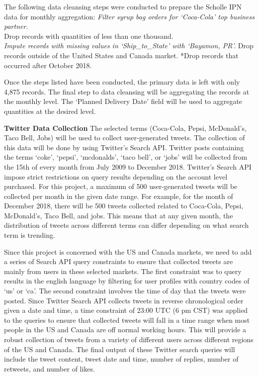 \documentclass[12pt,oneside]{chicagocapstone}
\begin{document}
The following data cleansing steps were conducted to prepare the Scholle IPN data for monthly aggregation:
\emph{Filter syrup bag orders for `Coca-Cola' top business partner.\\
}Drop records with quantities of less than one thousand.\\
\emph{Impute records with missing values in `Ship\_to\_State' with `Bayamon, PR'.
}Drop records outside of the United States and Canada market.
*Drop records that occurred after October 2018.

Once the steps listed have been conducted, the primary data is left with only 4,875 records. The final step to data cleansing will be aggregating the records at the monthly level. The `Planned Delivery Date' field will be used to aggregate quantities at the desired level.

\textbf{Twitter Data Collection}
The selected terms (Coca-Cola, Pepsi, McDonald's, Taco Bell, Jobs) will be used to collect user-generated tweets. The collection of this data will be done by using Twitter's Search API. Twitter posts containing the terms `coke', `pepsi', `mcdonalds', `taco bell', or `jobs' will be collected from the 15th of every month from July 2009 to December 2018. Twitter's Search API impose strict restrictions on query results depending on the account level purchased. For this project, a maximum of 500 user-generated tweets will be collected per month in the given date range. For example, for the month of December 2018, there will be 500 tweets collected related to Coca-Cola, Pepsi, McDonald's, Taco Bell, and jobs. This means that at any given month, the distribution of tweets across different terms can differ depending on what search term is trending.

Since this project is concerned with the US and Canada markets, we need to add a series of Search API query constraints to ensure that collected tweets are mainly from users in these selected markets. The first constraint was to query results in the english language by filtering for user profiles with country codes of `us' or `ca'. The second constraint involves the time of day that the tweets were posted. Since Twitter Search API collects tweets in reverse chronological order given a date and time, a time constraint of 23:00 UTC (6 pm CST) was applied to the queries to ensure that collected tweets will fall in a time range when most people in the US and Canada are off normal working hours. This will provide a robust collection of tweets from a variety of different users across different regions of the US and Canada. The final output of these Twitter search queries will include the tweet content, tweet date and time, number of replies, number of retweets, and number of likes.
\end{document}
